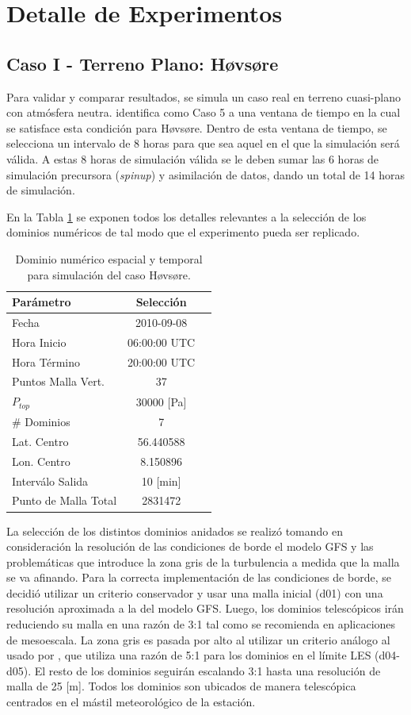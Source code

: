 \section{Detalle de Experimentos}
\subsection{Caso I - Terreno Plano: Høvsøre}
Para validar y comparar resultados, se simula un caso real en terreno cuasi-plano con atmósfera neutra. \cite{Pea2013} identifica como Caso 5 a una ventana de tiempo en la cual se satisface esta condición para Høvsøre. Dentro de esta ventana de tiempo, se selecciona un intervalo de 8 horas para que sea aquel en el que la simulación será válida. A estas 8 horas de simulación válida se le deben sumar las 6 horas de simulación precursora (\emph{spinup}) y asimilación de datos, dando un total de 14 horas de simulación.

En la Tabla \ref{tab:05_config_hov} se exponen todos los detalles relevantes a la selección de los dominios numéricos de tal modo que el experimento pueda ser replicado.

\begin{table}[h!]
	\caption{Dominio numérico espacial y temporal para simulación del caso Høvsøre.}\label{tab:05_config_hov}
	\centering\footnotesize
	\begin{tabular}{lcc}
		\toprule
		Parámetro & Selección \\
		\midrule
		Fecha	 	 & 2010-09-08   \\
		Hora Inicio	 	 & 06:00:00   UTC \\
		Hora Término	 		 & 20:00:00 UTC  \\
		Puntos Malla Vert.	 	 & 37   \\
		$P_{top}$ 	& 30000 [Pa]\\
		\# Dominios	& 7   \\
		Lat. Centro	& 56.440588   \\
		Lon. Centro	& 8.150896   \\
		Interválo Salida & 10 [min]\\
		Punto de Malla Total & 2831472\\
		\bottomrule
	\end{tabular}
\end{table}

La selección de los distintos dominios anidados se realizó tomando en consideración la resolución de las condiciones de borde el modelo GFS y las problemáticas que introduce la zona gris de la turbulencia a medida que la malla se va afinando. Para la correcta implementación de las condiciones de borde, se decidió utilizar un criterio conservador y usar una malla inicial (d01) con una resolución aproximada a la del modelo GFS. Luego, los dominios telescópicos irán reduciendo su malla en una razón de 3:1 tal como se recomienda en aplicaciones de mesoescala. La zona gris es pasada por alto al utilizar un criterio análogo al usado por \cite{Green2015}, que utiliza una razón de 5:1 para los dominios en el límite LES (d04-d05). El resto de los dominios seguirán escalando 3:1 hasta una resolución de malla de 25 [m]. Todos los dominios son ubicados de manera telescópica centrados en el mástil meteorológico de la estación.

